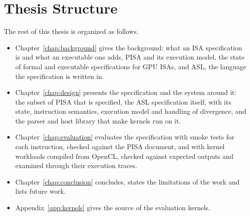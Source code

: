 \section{Thesis Structure}

The rest of this thesis is organized as follows.

\begin{itemize}
\item Chapter~\ref{chap:background} gives the background: what an ISA
  specification is and what an executable one adds, PISA and its
  execution model, the state of formal and executable specifications for
  GPU ISAs, and ASL, the language the specification is written in.
\item Chapter~\ref{chap:design} presents the specification and the
  system around it: the subset of PISA that is specified, the ASL
  specification itself, with its state, instruction semantics, execution
  model and handling of divergence, and the parser and host library that
  make kernels run on it.
\item Chapter~\ref{chap:evaluation} evaluates the specification with
  smoke tests for each instruction, checked against the PISA document,
  and with kernel workloads compiled from OpenCL, checked against
  expected outputs and examined through their execution traces.
\item Chapter~\ref{chap:conclusion} concludes, states the limitations of the work and lists future work.
\item Appendix~\ref{app:kernels} gives the source of the evaluation
  kernels.
\end{itemize}